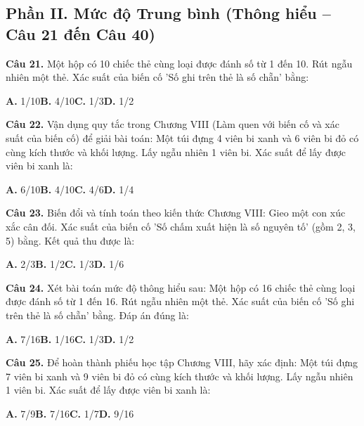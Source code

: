 \documentclass[11pt,a4paper]{article}
\begin{document}
\subsection*{\color{accent} Phần II. Mức độ Trung bình (Thông hiểu -- Câu 21 đến Câu 40)}
\textbf{\color{primary} Câu 21.} Một hộp có 10 chiếc thẻ cùng loại được đánh số từ 1 đến 10. Rút ngẫu nhiên một thẻ. Xác suất của biến cố 'Số ghi trên thẻ là số chẵn' bằng:\par
\hspace*{1.5em}\textbf{A.} 1/10\quad\quad \textbf{B.} 4/10\quad\quad \textbf{C.} 1/3\quad\quad \textbf{D.} 1/2\par\vspace{2pt}
\textbf{\color{primary} Câu 22.} Vận dụng quy tắc trong Chương VIII (Làm quen với biến cố và xác suất của biến cố) để giải bài toán: Một túi đựng 4 viên bi xanh và 6 viên bi đỏ có cùng kích thước và khối lượng. Lấy ngẫu nhiên 1 viên bi. Xác suất để lấy được viên bi xanh là:\par
\hspace*{1.5em}\textbf{A.} 6/10\quad\quad \textbf{B.} 4/10\quad\quad \textbf{C.} 4/6\quad\quad \textbf{D.} 1/4\par\vspace{2pt}
\textbf{\color{primary} Câu 23.} Biến đổi và tính toán theo kiến thức Chương VIII: Gieo một con xúc xắc cân đối. Xác suất của biến cố 'Số chấm xuất hiện là số nguyên tố' (gồm 2, 3, 5) bằng. Kết quả thu được là:\par
\hspace*{1.5em}\textbf{A.} 2/3\quad\quad \textbf{B.} 1/2\quad\quad \textbf{C.} 1/3\quad\quad \textbf{D.} 1/6\par\vspace{2pt}
\textbf{\color{primary} Câu 24.} Xét bài toán mức độ thông hiểu sau: Một hộp có 16 chiếc thẻ cùng loại được đánh số từ 1 đến 16. Rút ngẫu nhiên một thẻ. Xác suất của biến cố 'Số ghi trên thẻ là số chẵn' bằng. Đáp án đúng là:\par
\hspace*{1.5em}\textbf{A.} 7/16\quad\quad \textbf{B.} 1/16\quad\quad \textbf{C.} 1/3\quad\quad \textbf{D.} 1/2\par\vspace{2pt}
\textbf{\color{primary} Câu 25.} Để hoàn thành phiếu học tập Chương VIII, hãy xác định: Một túi đựng 7 viên bi xanh và 9 viên bi đỏ có cùng kích thước và khối lượng. Lấy ngẫu nhiên 1 viên bi. Xác suất để lấy được viên bi xanh là:\par
\hspace*{1.5em}\textbf{A.} 7/9\quad\quad \textbf{B.} 7/16\quad\quad \textbf{C.} 1/7\quad\quad \textbf{D.} 9/16\par\vspace{2pt}
\end{document}
